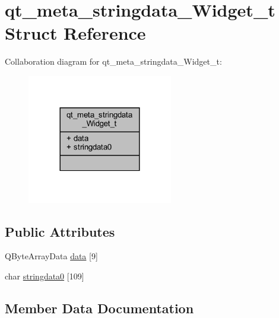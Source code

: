 \hypertarget{structqt__meta__stringdata___widget__t}{}\section{qt\+\_\+meta\+\_\+stringdata\+\_\+\+Widget\+\_\+t Struct Reference}
\label{structqt__meta__stringdata___widget__t}


Collaboration diagram for qt\+\_\+meta\+\_\+stringdata\+\_\+\+Widget\+\_\+t\+:
\nopagebreak
\begin{figure}[H]
\begin{center}
\leavevmode
\includegraphics[width=180pt]{structqt__meta__stringdata___widget__t__coll__graph}
\end{center}
\end{figure}
\subsection*{Public Attributes}
\begin{DoxyCompactItemize}
\item 
Q\+Byte\+Array\+Data \mbox{\hyperlink{structqt__meta__stringdata___widget__t_adb457c6767922b075b67514df21769d2}{data}} \mbox{[}9\mbox{]}
\item 
char \mbox{\hyperlink{structqt__meta__stringdata___widget__t_ad8f819353744095c83629eddef74ccc8}{stringdata0}} \mbox{[}109\mbox{]}
\end{DoxyCompactItemize}


\subsection{Member Data Documentation}
\mbox{\label{structqt__meta__stringdata___widget__t_adb457c6767922b075b67514df21769d2}} 
